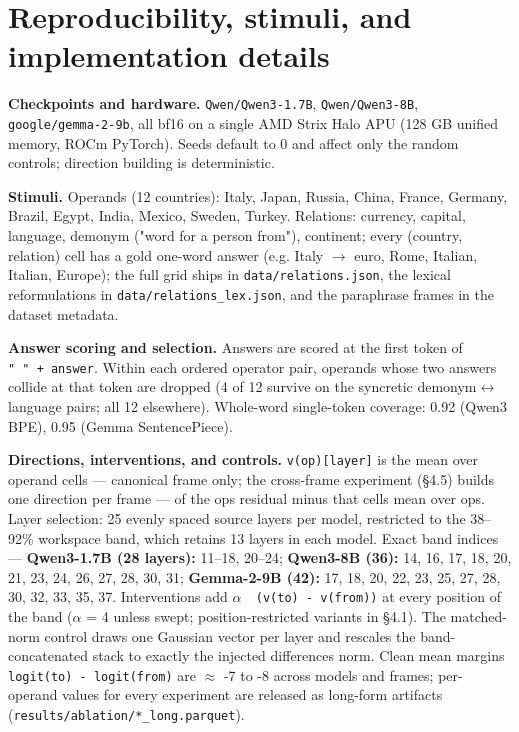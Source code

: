 \section{Reproducibility, stimuli, and implementation
details}

\textbf{Checkpoints and hardware.} \texttt{Qwen/Qwen3-1.7B},
\texttt{Qwen/Qwen3-8B}, \texttt{google/gemma-2-9b}, all bf16 on a single
AMD Strix Halo APU (128 GB unified memory, ROCm PyTorch). Seeds default
to 0 and affect only the random controls; direction building is
deterministic.

\textbf{Stimuli.} Operands (12 countries): Italy, Japan, Russia, China,
France, Germany, Brazil, Egypt, India, Mexico, Sweden, Turkey.
Relations: currency, capital, language, demonym ("word for a person
from"), continent; every (country, relation) cell has a gold one-word
answer (e.g. Italy \ensuremath{\to} euro, Rome, Italian, Italian, Europe); the full
grid ships in \texttt{data/relations.json}, the lexical reformulations
in \texttt{data/relations\_lex.json}, and the paraphrase frames in the
dataset metadata.

\textbf{Answer scoring and selection.} Answers are scored at the first
token of \texttt{"\ "\ +\ answer}. Within each ordered operator pair,
operands whose two answers collide at that token are dropped (4 of 12
survive on the syncretic demonym\ensuremath{\leftrightarrow}language pairs; all 12 elsewhere).
Whole-word single-token coverage: 0.92 (Qwen3 BPE), 0.95 (Gemma
SentencePiece).

\textbf{Directions, interventions, and controls.}
\texttt{v(op){[}layer{]}} is the mean over operand cells --- canonical
frame only; the cross-frame experiment (\S{}4.5) builds one direction per
frame --- of the op\textquotesingle s residual minus that
cell\textquotesingle s mean over ops. Layer selection: 25 evenly spaced
source layers per model, restricted to the 38--92\% workspace band,
which retains 13 layers in each model. Exact band indices ---
\textbf{Qwen3-1.7B (28 layers):} 11--18, 20--24; \textbf{Qwen3-8B (36):}
14, 16, 17, 18, 20, 21, 23, 24, 26, 27, 28, 30, 31; \textbf{Gemma-2-9B
(42):} 17, 18, 20, 22, 23, 25, 27, 28, 30, 32, 33, 35, 37. Interventions
add \texttt{\ensuremath{\alpha}\ \textperiodcentered{}\ (v(to)\ -\ v(from))} at every position of the band (\ensuremath{\alpha}
= 4 unless swept; position-restricted variants in \S{}4.1). The
matched-norm control draws one Gaussian vector per layer and rescales
the band-concatenated stack to exactly the injected
difference\textquotesingle s norm. Clean mean margins
\texttt{logit(to)\ -\ logit(from)} are \ensuremath{\approx} -7 to -8 across models and
frames; per-operand values for every experiment are released as
long-form artifacts (\texttt{results/ablation/*\_long.parquet}).

